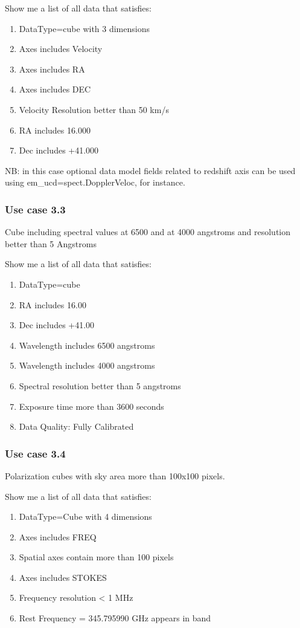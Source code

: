 \documentclass[11pt,a4paper]{ivoa}
\begin{document}
Show me a list of all data that satisfies:

\begin{enumerate}
\item DataType=cube with 3 dimensions
\item Axes includes Velocity\ \ \ \
\item Axes includes RA
\item Axes includes DEC
\item Velocity Resolution better than 50 km/s
\item RA includes 16.000
\item Dec includes +41.000
\end{enumerate}
NB: in this case optional data model fields related to redshift axis can be used using  em\_ucd=spect.DopplerVeloc, for
instance.

\subsubsection{Use case 3.3}
Cube including spectral values at 6500 and at 4000 angstroms and resolution better than 5 Angstroms

Show me a list of all data that satisfies:

\begin{enumerate}
\item DataType=cube
\item RA includes 16.00
\item Dec includes +41.00
\item Wavelength includes 6500 angstroms
\item Wavelength includes 4000 angstroms
\item Spectral resolution better than 5 angstroms
\item Exposure time more than 3600 seconds
\item Data Quality: Fully Calibrated
\end{enumerate}
\subsubsection{Use case 3.4}
Polarization cubes with sky area more than 100x100 pixels.

Show me a list of all data that satisfies:

\begin{enumerate}
\item DataType=Cube with 4 dimensions
\item Axes includes FREQ
\item Spatial axes contain more than  100 pixels
\item Axes includes STOKES
\item Frequency resolution {\textless} 1 MHz
\item Rest Frequency = 345.795990 GHz appears in band
\end{enumerate}
\end{document}
